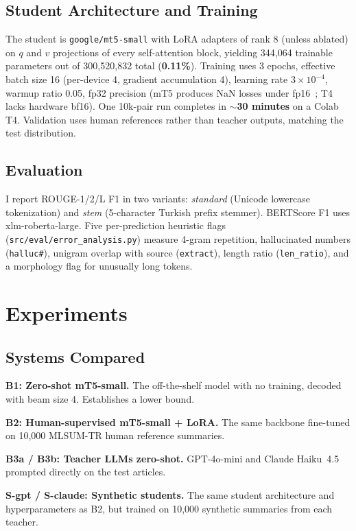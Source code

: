 \documentclass{llncs}
\begin{document}
\subsection{Student Architecture and Training}

The student is \texttt{google/mt5-small} with LoRA adapters of rank 8 (unless ablated) on $q$ and $v$ projections of every self-attention block, yielding 344{,}064 trainable parameters out of 300{,}520{,}832 total (\textbf{0.11\%}). Training uses 3 epochs, effective batch size 16 (per-device 4, gradient accumulation 4), learning rate $3 \times 10^{-4}$, warmup ratio 0.05, fp32 precision (mT5 produces NaN losses under fp16~\cite{xue2021mt5}; T4 lacks hardware bf16). One 10k-pair run completes in $\sim$\textbf{30 minutes} on a Colab T4. Validation uses human references rather than teacher outputs, matching the test distribution.

\subsection{Evaluation}

I report ROUGE-1/2/L F1 in two variants: \emph{standard} (Unicode lowercase tokenization) and \emph{stem} (5-character Turkish prefix stemmer). BERTScore F1 uses xlm-roberta-large. Five per-prediction heuristic flags (\texttt{src/eval/error\_analysis.py}) measure 4-gram repetition, hallucinated numbers (\texttt{halluc\#}), unigram overlap with source (\texttt{extract}), length ratio (\texttt{len\_ratio}), and a morphology flag for unusually long tokens.

\section{Experiments}

\subsection{Systems Compared}

\textbf{B1: Zero-shot mT5-small.} The off-the-shelf model with no training, decoded with beam size 4. Establishes a lower bound.

\textbf{B2: Human-supervised mT5-small + LoRA.} The same backbone fine-tuned on 10{,}000 MLSUM-TR human reference summaries.

\textbf{B3a / B3b: Teacher LLMs zero-shot.} GPT-4o-mini and Claude Haiku~4.5 prompted directly on the test articles.

\textbf{S-gpt / S-claude: Synthetic students.} The same student architecture and hyperparameters as B2, but trained on 10{,}000 synthetic summaries from each teacher.
\end{document}
